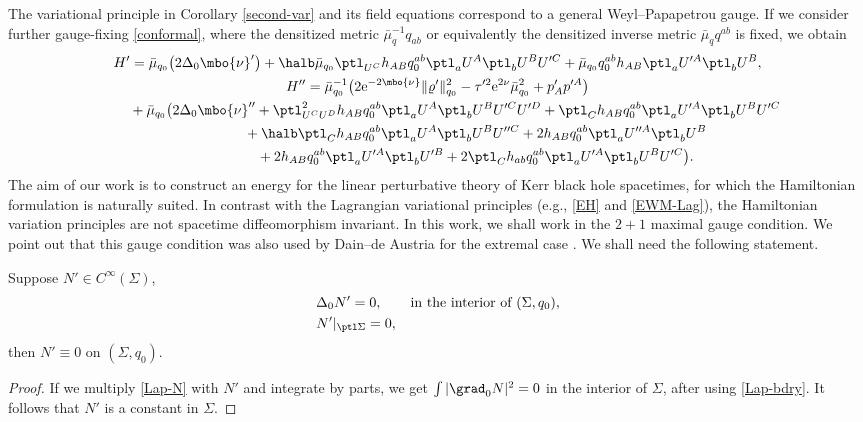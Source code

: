 The variational principle in Corollary \ref{second-var} and its field equations correspond to a general Weyl--Papapetrou gauge. If we consider further gauge-fixing \eqref{conformal}, where the densitized metric $ \bar{\mu}^{-1}_q q_{ab}$ or equivalently the densitized inverse metric $\bar{\mu}_q q^{ab}$ is fixed, we obtain
\begin{gather*}
H' = \bar{\mu}_{q_0} \bigl(2 \Delta_0 \mbo{\nu}'\bigr) + \halb \bar{\mu}_{q_0} \ptl_{U^C} h_{AB} q_0^{ab} \ptl_a U^A \ptl_b U^B U'^C
+ \bar{\mu}_{q_0} q_0^{ab} h_{AB} \ptl_a U'^A \ptl_b U^B, \notag\\
H'' =\bar{\mu}^{-1}_{q_0} \bigl(2 {\rm e}^{-2\mbo{\nu}} \Vert \varrho' \Vert^2_{q_0} - \tau'^2 {\rm e}^{2\nu} \bar{\mu}^2_{q_0} + p'_A p'^A\bigr)\notag \\
\hphantom{H'' =}{}
+ \bar{\mu}_{q_0} \bigl(2 \Delta_0 \mbo{\nu}'' + \ptl^2_{U^C U^D} h_{AB} q^{ab}_0 \ptl_a U^A \ptl_b U^B U'^C U'^D + \ptl_C h_{AB} q^{ab}_0 \ptl_a U'^A \ptl_b U^B U'^C \notag\\
\hphantom{H'' =+ \bar{\mu}_{q_0} \bigl(}{}
+ \halb \ptl_Ch_{AB} q_{0}^{ab} \ptl_a U^A \ptl_b U^B U''^C + 2 h_{AB} q^{ab}_{0} \ptl_a U''^A \ptl_b U^B \notag\\
\hphantom{H'' =+ \bar{\mu}_{q_0} \bigl(}{}
+ 2h_{AB} q^{ab}_0 \ptl_a U'^A \ptl_bU'^B + 2 \ptl_C h_{ab} q^{ab}_0 \ptl_a U'^A \ptl_b U^B U'^C \bigr).
\end{gather*}
The aim of our work is to construct an energy for the linear perturbative theory of Kerr black hole spacetimes, for which the Hamiltonian formulation is naturally suited. In contrast with the Lagrangian variational principles (e.g., \eqref{EH} and \eqref{EWM-Lag}), the Hamiltonian variation principles are not spacetime diffeomorphism invariant.
In this work, we shall work in the $2 + 1$ maximal gauge condition. We point out that this gauge condition was also used by Dain--de Austria for the extremal case \cite{DA_14}. We shall need the following statement.

\begin{claim} \label{2+1max}
Suppose $N' \in C^{\infty} (\Sigma)$,
\begin{subequations}
\begin{align}
&\Delta_0 N' = 0, \qquad \textnormal{in the interior of $(\Sigma, q_0 )$}, \label{Lap-N}\\
&N' \vert_{\ptl \Sigma}= 0, \label{Lap-bdry}
\end{align}
\end{subequations}
 then $ N' \equiv 0$ on $(\Sigma, q_0)$.
\end{claim}
\begin{proof}
If we multiply \eqref{Lap-N} with $N'$ and integrate by parts, we get $\int \vert \grad_0 N \vert^2 =0$ in the interior of $\Sigma$, after using \eqref{Lap-bdry}. It follows that $N'$ is a constant in $\Sigma$.
\end{proof}

